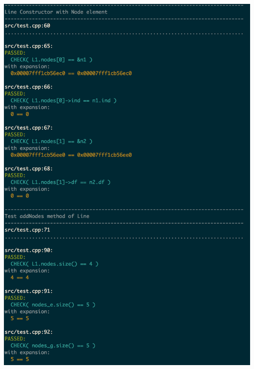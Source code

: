 \documentclass[unknownkeysallowed,12pt,mathserif]{beamer}
\begin{document}
\begin{frame}
\begin{columns}[c]
\begin{column}{5cm}
\includegraphics[scale=0.21]{catch.png}
\end{column}
\end{columns}

\end{frame}
\end{document}

